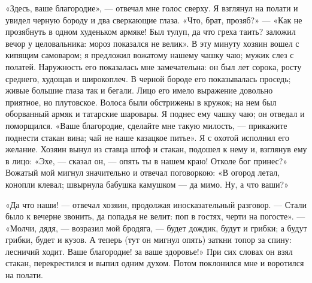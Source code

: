 «Здесь, ваше благородие», — отвечал мне голос сверху. Я взглянул на полати и увидел черную бороду и два сверкающие глаза. «Что, брат, прозяб?» — «Как не прозябнуть в одном худеньком армяке! Был тулуп, да что греха таить? заложил вечор у целовальника: мороз показался не велик». В эту минуту хозяин вошел с кипящим самоваром; я предложил вожатому нашему чашку чаю; мужик слез с полатей. Наружность его показалась мне замечательна: он был лет сорока, росту среднего, худощав и широкоплеч. В черной бороде его показывалась проседь; живые большие глаза так и бегали. Лицо его имело выражение довольно приятное, но плутовское. Волоса были обстрижены в кружок; на нем был оборванный армяк и татарские шаровары. Я поднес ему чашку чаю; он отведал и поморщился. «Ваше благородие, сделайте мне такую милость, — прикажите поднести стакан вина; чай не наше казацкое питье». Я с охотой исполнил его желание. Хозяин вынул из ставца штоф и стакан, подошел к нему и, взглянув ему в лицо: «Эхе, — сказал он, — опять ты в нашем краю! Отколе бог принес?» Вожатый мой мигнул значительно и отвечал поговоркою: «В огород летал, конопли клевал; швырнула бабушка камушком — да мимо. Ну, а что ваши?»

«Да что наши! — отвечал хозяин, продолжая иносказательный разговор. — Стали было к вечерне звонить, да попадья не велит: поп в гостях, черти на погосте». — «Молчи, дядя, — возразил мой бродяга, — будет дождик, будут и грибки; а будут грибки, будет и кузов. А теперь (тут он мигнул опять) заткни топор за спину: лесничий ходит. Ваше благородие! за ваше здоровье!» При сих словах он взял стакан, перекрестился и выпил одним духом. Потом поклонился мне и воротился на полати.

